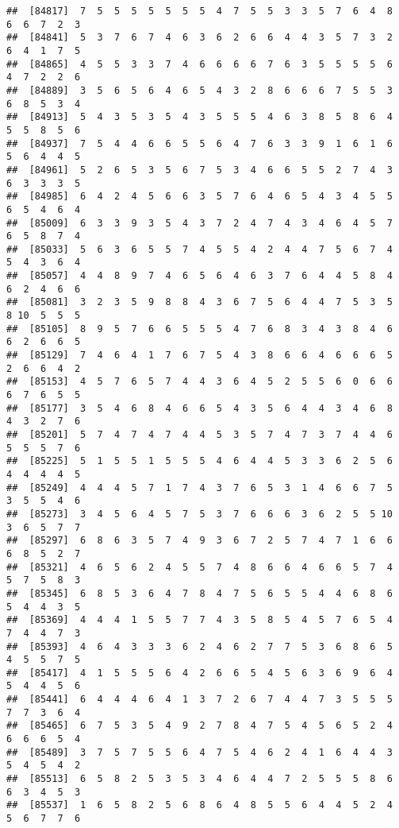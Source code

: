 \documentclass[
]{book}
\begin{document}
\begin{verbatim}
##  [84817]  7  5  5  5  5  5  5  5  4  7  5  5  3  3  5  7  6  4  8  6  6  7  2  3
##  [84841]  5  3  7  6  7  4  6  3  6  2  6  6  4  4  3  5  7  3  2  6  4  1  7  5
##  [84865]  4  5  5  3  3  7  4  6  6  6  6  7  6  3  5  5  5  5  6  4  7  2  2  6
##  [84889]  3  5  6  5  6  4  6  5  4  3  2  8  6  6  6  7  5  5  3  6  8  5  3  4
##  [84913]  5  4  3  5  3  5  4  3  5  5  5  4  6  3  8  5  8  6  4  5  5  8  5  6
##  [84937]  7  5  4  4  6  6  5  5  6  4  7  6  3  3  9  1  6  1  6  5  6  4  4  5
##  [84961]  5  2  6  5  3  5  6  7  5  3  4  6  6  5  5  2  7  4  3  6  3  3  3  5
##  [84985]  6  4  2  4  5  6  6  3  5  7  6  4  6  5  4  3  4  5  5  6  5  4  6  4
##  [85009]  6  3  3  9  3  5  4  3  7  2  4  7  4  3  4  6  4  5  7  6  5  8  7  4
##  [85033]  5  6  3  6  5  5  7  4  5  5  4  2  4  4  7  5  6  7  4  5  4  3  6  4
##  [85057]  4  4  8  9  7  4  6  5  6  4  6  3  7  6  4  4  5  8  4  6  2  4  6  6
##  [85081]  3  2  3  5  9  8  8  4  3  6  7  5  6  4  4  7  5  3  5  8 10  5  5  5
##  [85105]  8  9  5  7  6  6  5  5  5  4  7  6  8  3  4  3  8  4  6  6  2  6  6  5
##  [85129]  7  4  6  4  1  7  6  7  5  4  3  8  6  6  4  6  6  6  5  2  6  6  4  2
##  [85153]  4  5  7  6  5  7  4  4  3  6  4  5  2  5  5  6  0  6  6  6  7  6  5  5
##  [85177]  3  5  4  6  8  4  6  6  5  4  3  5  6  4  4  3  4  6  8  4  3  2  7  6
##  [85201]  5  7  4  7  4  7  4  4  5  3  5  7  4  7  3  7  4  4  6  5  5  5  7  6
##  [85225]  5  1  5  5  1  5  5  5  4  6  4  4  5  3  3  6  2  5  6  4  4  4  4  5
##  [85249]  4  4  4  5  7  1  7  4  3  7  6  5  3  1  4  6  6  7  5  3  5  5  4  6
##  [85273]  3  4  5  6  4  5  7  5  3  7  6  6  6  3  6  2  5  5 10  3  6  5  7  7
##  [85297]  6  8  6  3  5  7  4  9  3  6  7  2  5  7  4  7  1  6  6  6  8  5  2  7
##  [85321]  4  6  5  6  2  4  5  5  7  4  8  6  6  4  6  6  5  7  4  5  7  5  8  3
##  [85345]  6  8  5  3  6  4  7  8  4  7  5  6  5  5  4  4  6  8  6  5  4  4  3  5
##  [85369]  4  4  4  1  5  5  7  7  4  3  5  8  5  4  5  7  6  5  4  7  4  4  7  3
##  [85393]  4  6  4  3  3  3  6  2  4  6  2  7  7  5  3  6  8  6  5  4  5  5  7  5
##  [85417]  4  1  5  5  5  6  4  2  6  6  5  4  5  6  3  6  9  6  4  5  4  4  5  6
##  [85441]  6  4  4  4  6  4  1  3  7  2  6  7  4  4  7  3  5  5  5  7  7  3  6  4
##  [85465]  6  7  5  3  5  4  9  2  7  8  4  7  5  4  5  6  5  2  4  6  6  6  5  4
##  [85489]  3  7  5  7  5  5  6  4  7  5  4  6  2  4  1  6  4  4  3  5  4  5  4  2
##  [85513]  6  5  8  2  5  3  5  3  4  6  4  4  7  2  5  5  5  8  6  6  3  4  5  3
##  [85537]  1  6  5  8  2  5  6  8  6  4  8  5  5  6  4  4  5  2  4  5  6  7  7  6

\end{verbatim}
\end{document}
